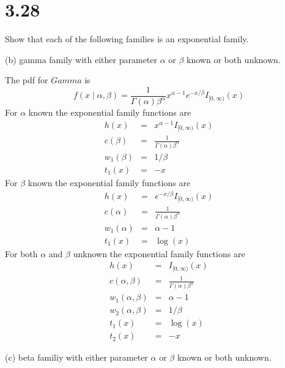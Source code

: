 \section*{3.28}
Show that each of the following families is an exponential family.

\bigskip
\noindent
(b) gamma family with either parameter $\alpha$ or $\beta$
known or both unknown.

\bigskip
\noindent
The pdf for $Gamma$ is
$$f(x\mid\alpha,\beta)=\frac{1}{\Gamma(\alpha)\beta^\alpha}
x^{\alpha-1}e^{-x/\beta}I_{[0,\infty)}(x)$$
%
For $\alpha$ known the exponential family functions are
\begin{eqnarray*}
h(x)&=&x^{\alpha-1}I_{[0,\infty)}(x)\\
c(\beta)&=&\frac{1}{\Gamma(\alpha)\beta^\alpha}\\
w_1(\beta)&=&1/\beta\\
t_1(x)&=&-x
\end{eqnarray*}
%
For $\beta$ known the exponential family functions are
\begin{eqnarray*}
h(x)&=&e^{-x/\beta}I_{[0,\infty)}(x)\\
c(\alpha)&=&\frac{1}{\Gamma(\alpha)\beta^\alpha}\\
w_1(\alpha)&=&\alpha-1\\
t_1(x)&=&\log(x)
\end{eqnarray*}
%
For both $\alpha$ and $\beta$ unknown the exponential
family functions are
\begin{eqnarray*}
h(x)&=&I_{[0,\infty)}(x)\\
c(\alpha,\beta)&=&\frac{1}{\Gamma(\alpha)\beta^\alpha}\\
w_1(\alpha,\beta)&=&\alpha-1\\
w_2(\alpha,\beta)&=&1/\beta\\
t_1(x)&=&\log(x)\\
t_2(x)&=&-x
\end{eqnarray*}

\bigskip
\noindent
(c) beta familiy with either parameter $\alpha$ or $\beta$
known or both unknown.

